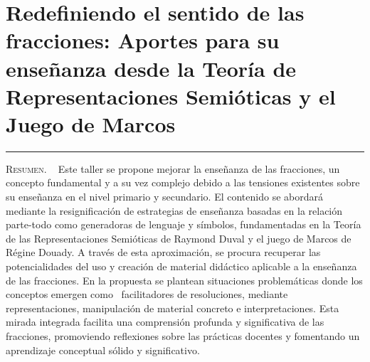 \thispagestyle{portadapage}
\setcounter{subsection}{0}
\setcounter{subsubsection}{0}
\setcounter{actividad}{0}
\setcounter{actividad_previa}{0}
\setcounter{actividad_entre}{0}
\renewcommand{\articulotipo}{Comunicación breve}
\renewcommand{\articulotitulo}{Redefiniendo el sentido de las fracciones: Aportes para su enseñanza desde la Teoría de Representaciones Semióticas y el Juego de Marcos}
\renewcommand{\articulotitulocorto}{Redefiniendo el sentido de las fracciones}
\section{\articulotitulo}

\noindent\rule{\linewidth}{2pt}

\vspace{0.25cm}

\begin{flushright}
	\vspace{1em}
	\vspace{1em}
\end{flushright}

\vspace{0.5cm}

\begin{center}
	\begin{minipage}{0.75\linewidth} \small
		\textsc{Resumen}. ~
		Este taller se propone mejorar la enseñanza de las fracciones, un concepto fundamental y a su vez complejo debido a las tensiones existentes sobre su enseñanza en el nivel primario y secundario. El contenido se abordará mediante la resignificación de estrategias de enseñanza basadas en la relación parte-todo como generadoras de lenguaje y símbolos, fundamentadas en la Teoría de las Representaciones Semióticas de Raymond Duval y el juego de Marcos de Régine Douady. A través de esta aproximación, se procura recuperar las potencialidades del uso y creación de material didáctico aplicable a la enseñanza de las fracciones. En la propuesta se plantean situaciones problemáticas donde los conceptos emergen como  facilitadores de resoluciones, mediante  representaciones, manipulación de material concreto e interpretaciones. Esta mirada integrada facilita una comprensión profunda y significativa de las fracciones, promoviendo reflexiones sobre las prácticas docentes y fomentando un aprendizaje conceptual sólido y significativo.
	\end{minipage}
\end{center}

